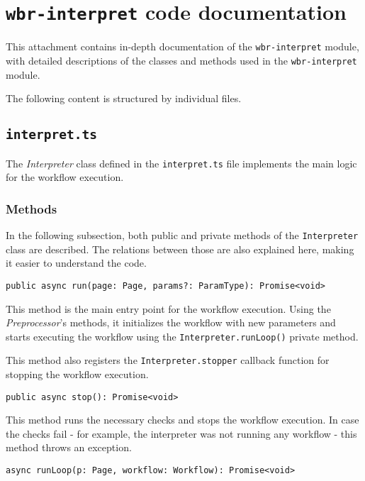 \section{\texttt{wbr-interpret} code documentation} \label{atta:interpretCode}
This attachment contains in-depth documentation of the \texttt{wbr-interpret} module, with detailed descriptions of the classes and methods
used in the \texttt{wbr-interpret} module.

The following content is structured by individual files.

\subsection{\texttt{interpret.ts}}

The \textit{Interpreter} class defined in the \texttt{interpret.ts} file implements the main logic for the workflow execution.

\subsubsection{Methods}

In the following subsection, both public and private methods of the \texttt{Interpreter} class are described.
The relations between those are also explained here, making it easier to understand the code.

\emptyline
\verb|public async run(page: Page, params?: ParamType): Promise<void>|

\smallskip

This method is the main entry point for the workflow execution.
Using the \textit{Preprocessor}'s methods, it initializes the workflow with new parameters and starts executing the workflow using the \texttt{Interpreter.runLoop()} private method.

This method also registers the \texttt{Interpreter.stopper} callback function for stopping the workflow execution.

\emptyline
\verb|public async stop(): Promise<void>|

\smallskip

This method runs the necessary checks and stops the workflow execution.
In case the checks fail - for example, the interpreter was not running any workflow - this method throws an exception. 

\emptyline
\verb|async runLoop(p: Page, workflow: Workflow): Promise<void>|

\smallskip

